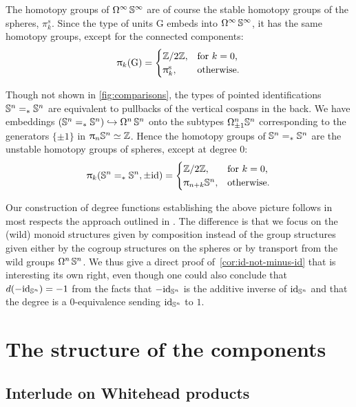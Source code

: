 \documentclass[english,a4paper]{lmcs}
\begin{document}
The homotopy groups of $\mathop{\Omega^{\infty}}{\mathbb S^{\infty}}$ are of course
the stable homotopy groups of the spheres, $\pi^s_k$.
Since the type of units $\mathrm{G}$ embeds into $\mathop{\Omega^{\infty}}{\mathbb S^{\infty}}$,
it has the same homotopy groups, except for the connected components:
\[
  \uppi_{k}(\mathrm{G}) =
  \begin{cases}
    \mathbb{Z}/2\mathbb{Z}, &\text{for $k=0$,} \\
    \uppi_{k}^{\mathrm s}, &\text{otherwise.}
  \end{cases}
\]

Though not shown in \cref{fig:comparisons}, the types of pointed identifications
${\mathbb S^{n}}=_*{\mathbb S^{n}}$ are equivalent to pullbacks of the vertical cospans in the back.
We have embeddings
$({\mathbb S^{n}}=_*{\mathbb S^{n}}) \hookrightarrow \mathop{\Omega^{n}}{\mathbb S^{n}}$ onto the subtypes
$\Omega^n_{\pm1}{\mathbb S^{n}}$ corresponding to the generators
$\{\pm1\}$ in $\uppi_{n}{\mathbb S^{n}}\simeq \mathbb{Z}$. Hence the homotopy groups
of ${\mathbb S^{n}}=_*{\mathbb S^{n}}$ are the unstable homotopy groups of spheres,
except at degree $0$:
\[
  \uppi_{k}({\mathbb S^{n}}=_* {\mathbb S^{n}},\pm\mathord{\mathrm{id}}) =
  \begin{cases}
    \mathbb{Z}/2\mathbb{Z}, &\text{for $k=0$,} \\
    \uppi_{n+k}{\mathbb S^{n}}, &\text{otherwise.}
  \end{cases}
\]

Our construction of degree functions establishing the above picture
follows in most respects the approach outlined in \cite[Sec.~5]{Buchholtz2018CellularCI}.
The difference is that we focus on the (wild) monoid structures given by composition
instead of the group structures given either by the cogroup structures on the spheres
or by transport from the wild groups $\mathop{\Omega^{n}}{\mathbb S^{n}}$.
We thus give a direct proof of~\cref{cor:id-not-minus-id} that is interesting
its own right,
even though one could also conclude that $d(-\mathord{\mathrm{id}}_{{\mathbb S^{n}}})=-1$ from
the facts that $-\mathord{\mathrm{id}}_{{\mathbb S^{n}}}$ is the additive inverse of $\mathord{\mathrm{id}}_{{\mathbb S^{n}}}$
and that the degree is a $0$-equivalence sending $\mathord{\mathrm{id}}_{{\mathbb S^{n}}}$ to $1$.

\section{The structure of the components}
\label{sec:structure-components}

\subsection{Interlude on Whitehead products}
\label{sec:whitehead-interlude}
\end{document}

